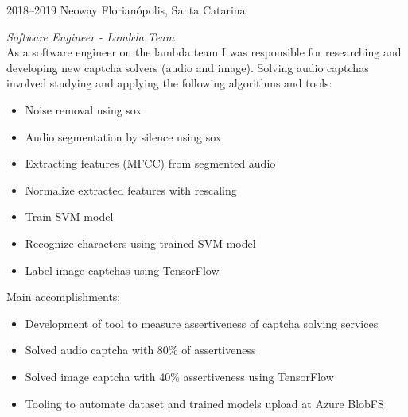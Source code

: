 \documentclass[]{friggeri-cv} %
\begin{document}
\begin{entrylist}
\entry
{2018--2019}
{Neoway}
{Florianópolis, Santa Catarina}
{\emph{Software Engineer - Lambda Team} \\

    As a software engineer on the lambda team I was responsible for researching
    and developing new captcha solvers (audio and image).
    Solving audio captchas involved studying and applying the following
    algorithms and tools:

\begin{itemize}
    \item Noise removal using sox
    \item Audio segmentation by silence using sox
    \item Extracting features (MFCC) from segmented audio
    \item Normalize extracted features with rescaling
    \item Train SVM model
    \item Recognize characters using trained SVM model
    \item Label image captchas using TensorFlow
\end{itemize}

Main accomplishments:\\

\begin{itemize}
    \item Development of tool to measure assertiveness of captcha solving services
    \item Solved audio captcha with 80\% of assertiveness
    \item Solved image captcha with 40\% assertiveness using TensorFlow
    \item Tooling to automate dataset and trained models upload at Azure BlobFS
\end{itemize}


}
\end{entrylist}
\end{document}
